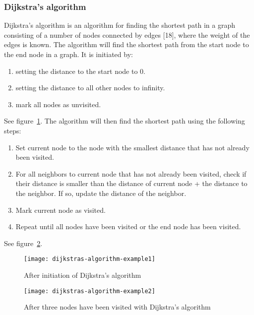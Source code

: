 \documentclass {article}
\begin{document}
\subsubsection{Dijkstra’s algorithm}
Dijkstra’s algorithm is an algorithm for finding the shortest path in a graph consisting of a number of nodes connected by edges [18], where the weight of the edges is known. The algorithm will find the shortest path from the start node to the end node in a graph. It is initiated by:
\begin{enumerate}
\item setting the distance to the start node to 0.
\item setting the distance to all other nodes to infinity.
\item mark all nodes as unvisited.
\end{enumerate}
See figure~\ref{fig:dijkstras-algorithm-example1}.
The algorithm will then find the shortest path using the following steps:
\begin{enumerate}
\item Set current node to the node with the smallest distance that has not already been visited.
\item For all neighbors to current node that has not already been visited, check if their distance is smaller than the distance of current node + the distance to the neighbor. If so, update the distance of the neighbor.
\item Mark current node as visited.
\item Repeat until all nodes have been visited or the end node has been visited.
\end{enumerate}
See figure~\ref{fig:dijkstras-algorithm-example2}.

\begin{figure}[H]
\texttt{[image: dijkstras-algorithm-example1]}

\caption{After initiation of Dijkstra’s algorithm}
\label{fig:dijkstras-algorithm-example1}
\end{figure}
\begin{figure}[H]
\texttt{[image: dijkstras-algorithm-example2]}

\caption{After three nodes have been visited with Dijkstra’s algorithm}
\label{fig:dijkstras-algorithm-example2}
\end{figure}
\end{document}
